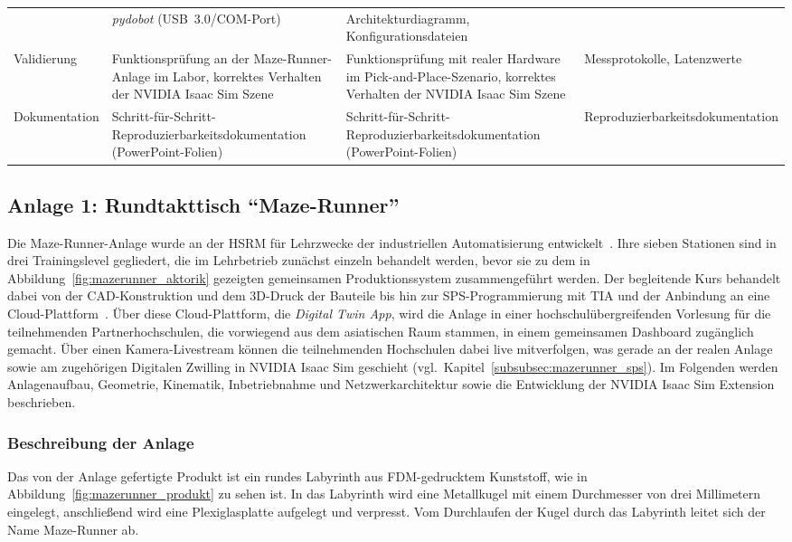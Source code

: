 \begin{table}[H]
\begin{tabularx}{\linewidth}{p{2.6cm}XXp{2.9cm}}
  & \emph{pydobot} (USB~3.0/COM-Port)
  & Architektur\-diagramm, Konfigurations\-dateien \\
\addlinespace
Validierung
  & Funktionsprüfung an der Maze-Runner-Anlage im Labor, korrektes Verhalten der NVIDIA Isaac Sim Szene
  & Funktionsprüfung mit realer Hardware im Pick-and-Place-Szenario, korrektes Verhalten der NVIDIA Isaac Sim Szene
  & Messprotokolle, Latenzwerte \\
\addlinespace
Dokumentation
  & Schritt-für-Schritt-Reproduzierbarkeits\-doku\-mentation (PowerPoint-Folien)
  & Schritt-für-Schritt-Reproduzierbarkeits\-doku\-mentation (PowerPoint-Folien)
  & Reproduzierbarkeits\-doku\-mentation \\
\bottomrule
\end{tabularx}
\end{table}

\subsection{Anlage 1: Rundtakttisch \enquote{Maze-Runner}}

Die Maze-Runner-Anlage wurde an der HSRM für Lehrzwecke der industriellen Automatisierung entwickelt~\cite{wang2024mazerunner}.
Ihre sieben Stationen sind in drei Trainingslevel gegliedert, die im Lehrbetrieb zunächst einzeln behandelt werden, bevor sie zu dem in Abbildung~\ref{fig:mazerunner_aktorik} gezeigten gemeinsamen Produktionssystem zusammengeführt werden.
Der begleitende Kurs behandelt dabei von der CAD-Konstruktion und dem 3D-Druck der Bauteile bis hin zur SPS-Programmierung mit TIA und der Anbindung an eine Cloud-Plattform~\cite{dtcenter_trainingslevel}.
Über diese Cloud-Plattform, die \emph{Digital Twin App}, wird die Anlage in einer hochschulübergreifenden Vorlesung für die teilnehmenden Partnerhochschulen, die vorwiegend aus dem asiatischen Raum stammen, in einem gemeinsamen Dashboard zugänglich gemacht.
Über einen Kamera-Livestream können die teilnehmenden Hochschulen dabei live mitverfolgen, was gerade an der realen Anlage sowie am zugehörigen Digitalen Zwilling in NVIDIA Isaac Sim geschieht (vgl.\ Kapitel~\ref{subsubsec:mazerunner_sps}).
Im Folgenden werden Anlagenaufbau, Geometrie, Kinematik, Inbetriebnahme und Netzwerkarchitektur sowie die Entwicklung der NVIDIA Isaac Sim Extension beschrieben.

\subsubsection{Beschreibung der Anlage}
Das von der Anlage gefertigte Produkt ist ein rundes Labyrinth aus FDM-gedrucktem Kunststoff, wie in Abbildung~\ref{fig:mazerunner_produkt} zu sehen ist.
In das Labyrinth wird eine Metallkugel mit einem Durchmesser von drei Millimetern eingelegt, anschließend wird eine Plexiglasplatte aufgelegt und verpresst.
Vom Durchlaufen der Kugel durch das Labyrinth leitet sich der Name Maze-Runner ab.

